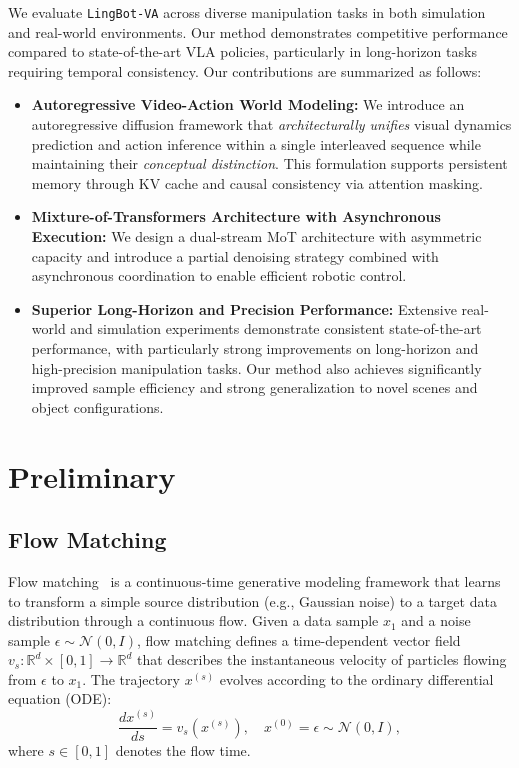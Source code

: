 \documentclass[onecolumn]{robbyant}           %
\newcommand\methodname{LingBot-VA}
\newcommand{\method}{\texttt{\methodname}\xspace}
\begin{document}
We evaluate \method across diverse manipulation tasks in both simulation and real-world environments.
Our method demonstrates competitive performance compared to state-of-the-art VLA policies, particularly in long-horizon tasks requiring temporal consistency.
Our contributions are summarized as follows:

\begin{itemize}
    \item \textbf{Autoregressive Video-Action World Modeling:} We introduce an autoregressive diffusion framework that \emph{architecturally unifies} visual dynamics prediction and action inference within a single interleaved sequence while maintaining their \emph{conceptual distinction}. This formulation supports persistent memory through KV cache and causal consistency via attention masking.

    \item \textbf{Mixture-of-Transformers Architecture with Asynchronous Execution:} We design a dual-stream MoT architecture with asymmetric capacity and introduce a partial denoising strategy combined with asynchronous coordination to enable efficient robotic control.

     \item \textbf{Superior Long-Horizon and Precision Performance:}
    Extensive real-world and simulation experiments demonstrate consistent state-of-the-art performance, with particularly strong improvements on long-horizon and high-precision manipulation tasks. Our method also achieves significantly improved sample efficiency and strong generalization to novel scenes and object configurations. 

\end{itemize}



\section{Preliminary}


\subsection{Flow Matching}

Flow matching~\cite{flowmatching,rectifiedflow,cfm} is a continuous-time generative modeling framework that learns to transform a simple
source distribution (e.g., Gaussian noise) to a target data distribution through a continuous flow.
Given a data sample $x_1$ and a noise sample $\epsilon \sim \mathcal{N}(0, I)$, flow matching defines
a time-dependent vector field $v_s: \mathbb{R}^d \times [0,1] \to \mathbb{R}^d$ that describes the
instantaneous velocity of particles flowing from $\epsilon$ to $x_1$.
The trajectory $x^{(s)}$ evolves according to the ordinary differential equation (ODE):
\begin{equation}
\frac{dx^{(s)}}{ds} = v_s(x^{(s)}), \quad x^{(0)} = \epsilon \sim \mathcal{N}(0, I),
\end{equation}
where $s \in [0, 1]$ denotes the flow time.
\end{document}
